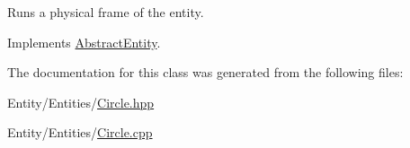 Runs a physical frame of the entity. 



Implements \hyperlink{class_abstract_entity_ac5602c7978aa4eaff46aa206f06046d7}{Abstract\+Entity}.



The documentation for this class was generated from the following files\+:\begin{DoxyCompactItemize}
\item 
Entity/\+Entities/\hyperlink{_circle_8hpp}{Circle.\+hpp}\item 
Entity/\+Entities/\hyperlink{_circle_8cpp}{Circle.\+cpp}\end{DoxyCompactItemize}
